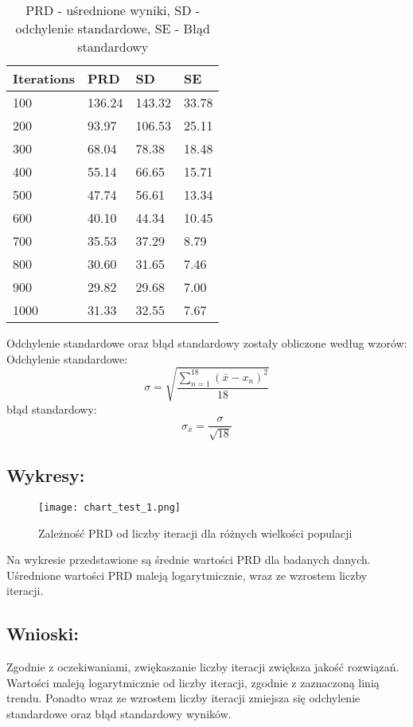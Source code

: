   \begin{table}[!ht]
    \centering
    \begin{tabular}{|l|l|l|l|}
    \hline
        Iterations & PRD & SD & SE \\ \hline
        100 & 136.24 & 143.32 & 33.78 \\ \hline
        200 & 93.97 & 106.53 & 25.11 \\ \hline
        300 & 68.04 & 78.38 & 18.48 \\ \hline
        400 & 55.14 & 66.65 & 15.71 \\ \hline
        500 & 47.74 & 56.61 & 13.34 \\ \hline
        600 & 40.10 & 44.34 & 10.45 \\ \hline
        700 & 35.53 & 37.29 & 8.79 \\ \hline
        800 & 30.60 & 31.65 & 7.46 \\ \hline
        900 & 29.82 & 29.68 & 7.00 \\ \hline
        1000 & 31.33 & 32.55 & 7.67 \\ \hline
    \end{tabular}
    \caption{PRD - uśrednione wyniki, SD - odchylenie standardowe, SE - Błąd standardowy}
  \end{table}

  Odchylenie standardowe oraz błąd standardowy zostały obliczone według wzorów: \\
    Odchylenie standardowe:
    \[ \sigma = \sqrt{\frac{\sum_{n = 1}^{18}(\bar{x} - x_n)^2}{18}} \]
    błąd standardowy:
    \[ \sigma_{\bar{x}} = \frac{\sigma}{\sqrt{18}} \]

  \subsection{Wykresy: }
    \begin{figure}[H]
      \texttt{[image: chart\_test\_1.png]}
      \centering
      \caption{Zależność PRD od liczby iteracji dla różnych wielkości populacji}
    \end{figure}
  
  Na wykresie przedstawione są średnie wartości PRD dla badanych danych. Uśrednione wartości PRD maleją logarytmicznie, wraz ze wzrostem liczby iteracji.

  \subsection{Wnioski: }
  Zgodnie z oczekiwaniami, zwiękaszanie liczby iteracji zwiększa jakość rozwiązań. Wartości maleją logarytmicznie od liczby iteracji, zgodnie z zaznaczoną linią trendu. Ponadto wraz ze wzrostem liczby iteracji zmiejsza się odchylenie standardowe oraz błąd standardowy wyników.

